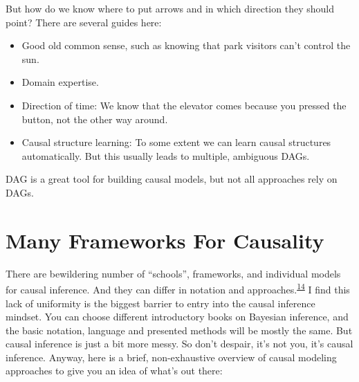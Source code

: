 \documentclass[
  10pt,
]{scrbook}
\providecommand{\tightlist}{%
  \setlength{\itemsep}{0pt}\setlength{\parskip}{0pt}}
\begin{document}
But how do we know where to put arrows and in which direction they should point?
There are several guides here:

\begin{itemize}
\tightlist
\item
  Good old common sense, such as knowing that park visitors can't control the sun.
\item
  Domain expertise.
\item
  Direction of time: We know that the elevator comes because you pressed the button, not the other way around.
\item
  Causal structure learning: To some extent we can learn causal structures automatically. But this usually leads to multiple, ambiguous DAGs.
\end{itemize}

DAG is a great tool for building causal models, but not all approaches rely on DAGs.

\hypertarget{many-frameworks-for-causality}{%
\section{Many Frameworks For Causality}\label{many-frameworks-for-causality}}

There are bewildering number of ``schools'', frameworks, and individual models for causal inference.
And they can differ in notation and approaches.\textsuperscript{\protect\hyperlink{ref-hernan2010causal}{14}}
I find this lack of uniformity is the biggest barrier to entry into the causal inference mindset.
You can choose different introductory books on Bayesian inference, and the basic notation, language and presented methods will be mostly the same.
But causal inference is just a bit more messy.
So don't despair, it's not you, it's causal inference.
Anyway, here is a brief, non-exhaustive overview of causal modeling approaches to give you an idea of what's out there:
\end{document}

